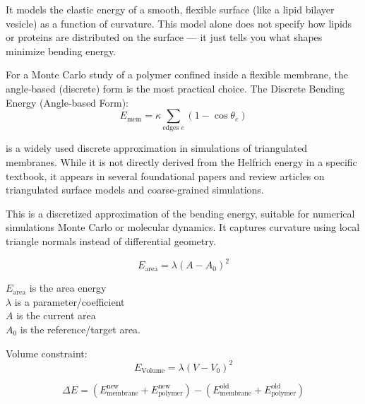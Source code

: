 \documentclass[12pt]{article}
\begin{document}
\begin{flushleft}
It models the elastic energy of a smooth, flexible surface (like a lipid bilayer vesicle) as a function of curvature. This model alone does not specify how lipids or proteins are distributed on the surface — it just tells you what shapes minimize bending energy.








For a Monte Carlo study of a polymer confined inside a flexible membrane, the angle‐based (discrete) form is the most practical choice. The Discrete Bending Energy (Angle-based Form):
\begin{equation}
E_{\text{mem}} = \kappa \sum_{\text{edges } e} \left(1 - \cos \theta_e \right)
\end{equation}


\noindent is a widely used discrete approximation in simulations of triangulated membranes. While it is not directly derived from the Helfrich energy in a specific textbook, it appears in several foundational papers and review articles on triangulated surface models and coarse-grained simulations\cite{gompper1997triangulated}.





This is a discretized approximation of the bending energy, suitable for numerical simulations Monte Carlo or molecular dynamics. It captures curvature using local triangle normals instead of differential geometry.


\begin{equation}
E_{\text{area}} = \lambda(A - A_0)^2
\end{equation}

$E_{\text{area}}$ is the area energy\\
$\lambda$ is a parameter/coefficient\\
$A$ is the current area\\
$A_0$ is the reference/target area.



Volume constraint:
\begin{equation}
E_{\text{Volume}} = \lambda(V - V_0)^2
\end{equation}



\begin{equation}
\Delta E = (E_{\text{membrane}}^{\text{new}} + E_{\text{polymer}}^{\text{new}}) - (E_{\text{membrane}}^{\text{old}} + E_{\text{polymer}}^{\text{old}})
\end{equation}



\end{flushleft}
\end{document}
